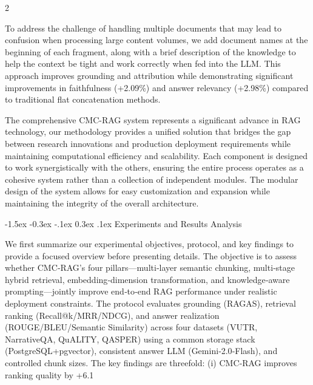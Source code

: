 \documentclass[10pt,letterpaper]{article}
\makeatletter
\renewcommand{\section}{\@startsection{section}{1}{\z@}%
                                   {-1.5ex \@plus -0.3ex \@minus -.1ex}%
                                   {0.3ex \@plus.1ex}%
                                   {\normalfont\large\bfseries}}
\renewcommand{\subsubsection}{\@startsection{subsubsection}{3}{\z@}%
                                     {-2.25ex\@plus -0.5ex \@minus -.2ex}%
                                     {0.3ex \@plus .1ex}%
                                     {\normalfont\normalsize\itshape}}
\makeatother
\begin{document}
\begin{multicols}{2}

To address the challenge of handling multiple documents that may lead to confusion when processing large content volumes, we add document names at the beginning of each fragment, along with a brief description of the knowledge to help the context be tight and work correctly when fed into the LLM. This approach improves grounding and attribution while demonstrating significant improvements in faithfulness (+2.09\%) and answer relevancy (+2.98\%) compared to traditional flat concatenation methods.

The comprehensive CMC-RAG system represents a significant advance in RAG technology, our methodology provides a unified solution that bridges the gap between research innovations and production deployment requirements while maintaining computational efficiency and scalability. Each component is designed to work synergistically with the others, ensuring the entire process operates as a cohesive system rather than a collection of independent modules. The modular design of the system allows for easy customization and expansion while maintaining the integrity of the overall architecture.



\section{Experiments and Results Analysis}


We first summarize our experimental objectives, protocol, and key findings to provide a focused overview before presenting details. The objective is to assess whether CMC‑RAG’s four pillars—multi‑layer semantic chunking, multi‑stage hybrid retrieval, embedding‑dimension transformation, and knowledge‑aware prompting—jointly improve end‑to‑end RAG performance under realistic deployment constraints. The protocol evaluates grounding (RAGAS), retrieval ranking (Recall@k/MRR/NDCG), and answer realization (ROUGE/BLEU/Semantic Similarity) across four datasets (VUTR, NarrativeQA, QuALITY, QASPER) using a common storage stack (PostgreSQL+pgvector), consistent answer LLM (Gemini‑2.0‑Flash), and controlled chunk sizes. The key findings are threefold: (i) CMC‑RAG improves ranking quality by +6.1%



\end{multicols}
\end{document}
